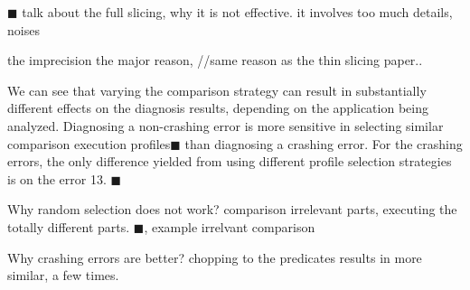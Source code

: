 $\blacksquare$ talk about the full slicing, why it is not
effective. it involves too much details, noises

the imprecision the major reason, //same reason as the thin slicing paper..

We can see that varying the comparison strategy can result in
substantially different effects on the diagnosis results,
depending on the application being analyzed. Diagnosing
a non-crashing error is more sensitive in selecting similar
comparison execution profiles$\blacksquare$ than diagnosing
a crashing error.
For the \crash crashing errors, the only difference yielded
from using different profile selection strategies is on
the error 13. $\blacksquare$

Why random selection does not work?
comparison irrelevant parts, executing the totally different parts.
$\blacksquare$, example irrelvant comparison

Why crashing errors are better? chopping to the predicates results
in more similar, a few times.

